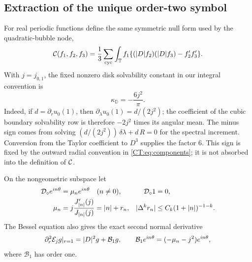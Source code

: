 \subsection{Extraction of the unique order-two symbol}

For real periodic functions define the same symmetric null form used by
the quadratic-bubble node,
\begin{equation}\label{CT:eq:null}
 \mathcal C(f_1,f_2,f_3)
 =\frac13\sum_{\rm cyc}
 \int_\mathbb T f_1\{(|D| f_2)(|D| f_3)-f_2'f_3'\}.
\end{equation}
With $j=j_{0,1}$, the fixed nonzero disk solvability constant in our
integral convention is
\begin{equation}\label{CT:eq:kappa}
 \boxed{\kappa_{\mathbb D}=-\frac{6j^2}{\pi}}.
\end{equation}
Indeed, if $d=\partial_ru_0(1)$, then
$\partial_\lambda u_0(1)=d/(2j^2)$; the coefficient of the cubic boundary
solvability row is therefore $-2j^2$ times its angular mean.  The minus
sign comes from solving
\(
 (d/(2j^2))\,\delta\lambda+d\,R=0
\)
for the spectral increment.  Conversion from the Taylor coefficient to
$D^3$ supplies the factor $6$.  This sign is fixed by the outward radial
convention in \eqref{CT:eq:components}; it is not absorbed into the definition
of \(\mathcal C\).

On the nongeometric subspace let
\begin{align}
 \mathcal D_\circ e^{in\theta}&=\mu_ne^{in\theta}\quad(n\ne0),
 &\mathcal D_\circ1&=0,\label{CT:eq:DtN}\\
 \mu_n&=j\frac{J_{|n|}'(j)}{J_{|n|}(j)}=|n|+r_n,
 &|\Delta^kr_n|&\le C_k(1+|n|)^{-1-k}.\notag
\end{align}
The Bessel equation also gives the exact second normal derivative
\begin{equation}\label{CT:eq:rr-exact}
 \partial_r^2\mathcal E_jg|_{r=1}
 =|D|^2g+\mathcal B_1g,
 \qquad
 \mathcal B_1e^{in\theta}=(-\mu_n-j^2)e^{in\theta},
\end{equation}
where $\mathcal B_1$ has order one.

